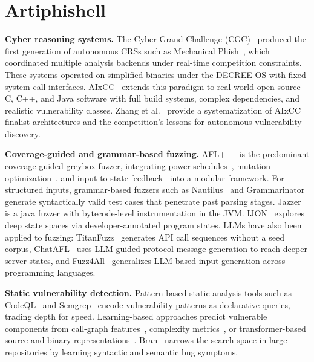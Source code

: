 
\section{Artiphishell}
\label{sec:rw-artiphishell}

\noindent
\textbf{Cyber reasoning systems.}
The Cyber Grand Challenge (CGC)~\cite{darpa2016cgc} produced the first generation of autonomous CRSs such as Mechanical Phish~\cite{shoshitaishvili2018mechanical}, which coordinated multiple analysis backends under real-time competition constraints.
These systems operated on simplified binaries under the DECREE OS with fixed system call interfaces.
AIxCC~\cite{aixcc} extends this paradigm to real-world open-source C, C++, and Java software with full build systems, complex dependencies, and realistic vulnerability classes.
Zhang et al.~\cite{zhang2026sokaixcc} provide a systematization of AIxCC finalist architectures and the competition's lessons for autonomous vulnerability discovery.

\medskip
\noindent
\textbf{Coverage-guided and grammar-based fuzzing.}
AFL++~\cite{aflplusplus} is the predominant coverage-guided greybox fuzzer, integrating power schedules~\cite{bohme2016aflfast}, mutation optimization~\cite{lyu2019mopt}, and input-to-state feedback~\cite{aschermann2019redqueen} into a modular framework.
For structured inputs, grammar-based fuzzers such as Nautilus~\cite{nautilus} and Grammarinator~\cite{grammarinator} generate syntactically valid test cases that penetrate past parsing stages.
Jazzer~\cite{jazzer} is a java fuzzer with bytecode-level instrumentation in the JVM.
IJON~\cite{aschermann2020ijon} explores deep state spaces via developer-annotated program states.
LLMs have also been applied to fuzzing: TitanFuzz~\cite{deng2023titanfuzz} generates API call sequences without a seed corpus, ChatAFL~\cite{meng2024chatafl} uses LLM-guided protocol message generation to reach deeper server states, and Fuzz4All~\cite{xia2024fuzz4all} generalizes LLM-based input generation across programming languages.

\medskip
\noindent
\textbf{Static vulnerability detection.}
Pattern-based static analysis tools such as CodeQL~\cite{codeql} and Semgrep~\cite{semgrep} encode vulnerability patterns as declarative queries, trading depth for speed.
Learning-based approaches predict vulnerable components from call-graph features~\cite{Neuhaus2007}, complexity metrics~\cite{Moshtari2013}, or transformer-based source and binary representations~\cite{thapa2022vuldeepecker}.
Bran~\cite{meng2021:Bran} narrows the search space in large repositories by learning syntactic and semantic bug symptoms.

